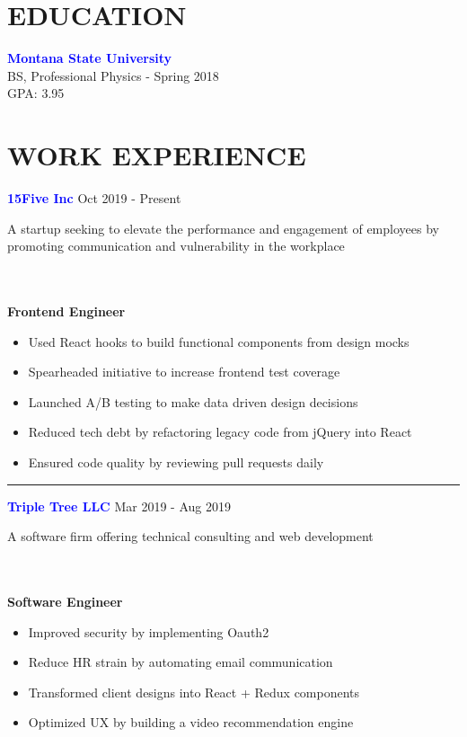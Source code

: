 \documentclass[12pt]{resume}
\begin{document}
    \begin{minipage}[t]{0.6\textwidth}
        {\section* {EDUCATION}}
        {\bf \textcolor{blue}{Montana State University}} \\
        BS, Professional Physics - Spring 2018\\
        GPA: 3.95
        \vspace{1em}
        {\section* {WORK EXPERIENCE}}
        \vspace{.5em}
        {\bf \textcolor{blue}{15Five Inc}} {\hfill Oct 2019 - Present}
        { \par A startup seeking to elevate the performance and engagement of employees by promoting communication and vulnerability in the workplace}\\\\
        {\bf Frontend Engineer}
        \vspace{.8em}
        \begin{itemize}
            \setlength\itemsep{-.2em}
            \item {Used React hooks to build functional components from design mocks}
            \item {Spearheaded initiative to increase frontend test coverage}
            \item {Launched A/B testing to make data driven design decisions}
            \item {Reduced tech debt by refactoring legacy code from jQuery into React}
            \item {Ensured code quality by reviewing pull requests daily}
        \end{itemize}

        \vspace{-.5em}
        \rule{\textwidth}{0.1pt}
        \vspace{.1em}

        {\bf \textcolor{blue}{Triple Tree LLC}} {\hfill Mar 2019 - Aug 2019}
        { \par A software firm offering technical consulting and web development}\\\\
        {\bf Software Engineer}
        \begin{itemize}
            \setlength\itemsep{-.2em}
            \item {Improved security by implementing Oauth2}
            \item {Reduce HR strain by automating email communication}
            \item {Transformed client designs into React + Redux components}
            \item {Optimized UX by building a video recommendation engine}
        \end{itemize}


\end{minipage}
\end{document}
